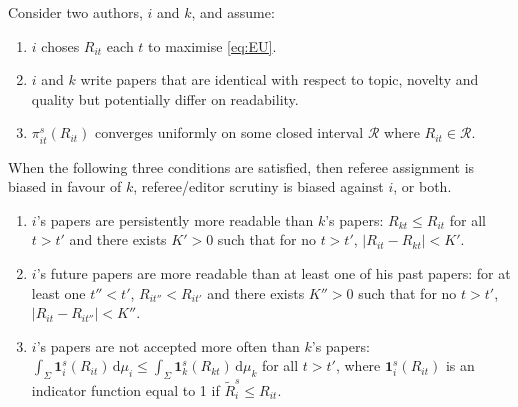 \begin{theorem}\label{Theorem1}
	Consider two authors, $i$ and $k$, and assume:
	\begin{enumerate}[label=Assumption \arabic*., leftmargin=*, widest*=2]
		\item $i$ choses $R_{it}$ each $t$ to maximise \autoref{eq:EU}.
		\item $i$ and $k$ write papers that are identical with respect to topic, novelty and quality but potentially differ on readability.
		\item $\pi_{it}^s(R_{it})$ converges uniformly on some closed interval $\mathcal R$ where $R_{it}\in\mathcal R$.
	\end{enumerate}
	When the following three conditions are satisfied, then referee assignment is biased in favour of $k$, referee/editor scrutiny is biased against $i$, or both.
	\begin{enumerate}[label=Condition \arabic*., leftmargin=*, widest*=2]
		\item $i$'s papers are persistently more readable than $k$'s papers: $R_{kt}\le R_{it}$ for all $t>t'$ and there exists $K'>0$ such that for no $t>t'$, $|R_{it}-R_{kt}|<K'$.
		\item $i$'s future papers are more readable than at least one of his past papers: for at least one $t''<t'$, $R_{it''}< R_{it'}$ and there exists $K''>0$ such that for no $t>t'$, $|R_{it}-R_{it''}|<K''$.
		\item $i$'s papers are not accepted more often than $k$'s papers: $\int_\Sigma\!\bm1_{i}^s(R_{it})\,\mathrm d\mu_i\le \int_\Sigma\!\bm1_{k}^s(R_{kt})\,\mathrm d\mu_k$ for all $t>t'$, where $\bm1_{i}^s(R_{it})$ is an indicator function equal to 1 if $\widetilde R_i^s\le R_{it}$.
	\end{enumerate}
\end{theorem}